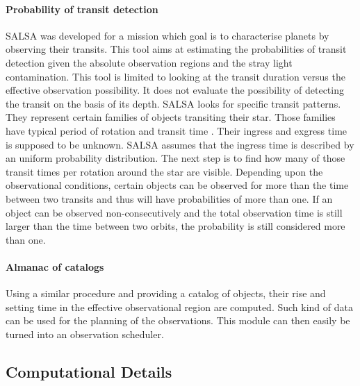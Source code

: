\documentclass[a4paper,10pt]{article}
\begin{document}
\paragraph {Probability of transit detection} SALSA was developed for a mission which goal is to characterise planets by observing their transits. This tool aims at estimating the probabilities of transit detection given the absolute observation regions and the stray light contamination. This tool is limited to looking at the transit duration versus the effective observation possibility. It does not evaluate the possibility of detecting the transit on the basis of its depth. SALSA looks for specific transit patterns. They represent certain families of objects transiting their star. Those families have typical period of rotation and transit time \citep{redbook}. Their ingress and exgress time is supposed to be unknown. SALSA assumes that the ingress time is described by an uniform probability distribution. The next step is to find how many of those transit times per rotation around the star are visible. Depending upon the observational conditions, certain objects can be observed for more than the time between two transits and thus will have probabilities of more than one. If an object can be observed non-consecutively and the total observation time is still larger than the time between two orbits, the probability is still considered more than one.
\paragraph {Almanac of catalogs} Using a similar procedure and providing a catalog of objects, their rise and setting time in the effective observational region are computed. Such kind of data can be used for the planning of the observations. This module can then easily be turned into an observation scheduler.


\subsection{Computational Details}\label{sec:numerics-functions}
\end{document}
